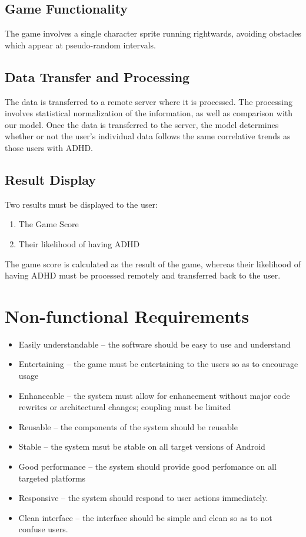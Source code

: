 \documentclass[a4wide]{article}
\begin{document}
\subsection{Game Functionality}
The game involves a single character sprite running rightwards, avoiding
obstacles which appear at pseudo-random intervals.

\subsection{Data Transfer and Processing}
The data is transferred to a remote server where it is processed. The processing
involves statistical normalization of the information, as well as comparison
with our model. Once the data is transferred to the server, the model determines
whether or not the user's individual data follows the same correlative trends as
those users with ADHD.

\subsection{Result Display}
Two results must be displayed to the user:
\begin{enumerate}
\item The Game Score
\item Their likelihood of having ADHD
\end{enumerate}
The game score is calculated as the result of the game, whereas their likelihood
of having ADHD must be processed remotely and transferred back to the user.

\section{Non-functional Requirements}
\begin{itemize}
\item Easily understandable -- the software should be easy to use and understand
\item Entertaining -- the game must be entertaining to the users so as to
encourage usage
\item Enhanceable -- the system must allow for enhancement without major code
rewrites or architectural changes; coupling must be limited
\item Reusable -- the components of the system should be reusable
\item Stable -- the system msut be stable on all target versions of Android
\item Good performance -- the system should provide good perfomance on all
targeted platforms
\item Responsive -- the system should respond to user actions immediately.
\item Clean interface -- the interface should be simple and clean so as to not
confuse users.
\end{itemize}
\end{document}
